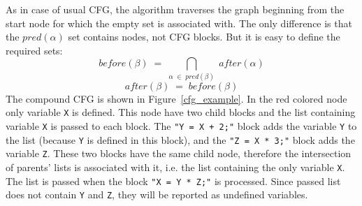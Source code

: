 \documentclass{sig-alternate-05-2015}
\begin{document}
As in case of usual CFG, the algorithm traverses the graph beginning from the start node for which the empty set is associated with. The only difference is that the $pred(\alpha)$ set contains nodes, not CFG blocks. But it is easy to define the required sets:
$$
before (\beta) \;=\; \bigcap_{\alpha \;\in\; pred(\beta)} \;after(\alpha)
$$
$$
after (\beta) \;=\; before (\beta)
$$
The compound CFG is shown in Figure~\ref{cfg_example}. In the red colored node only variable \verb|X| is defined. This node have two child blocks and the list containing variable \verb|X| is passed to each block. The \verb|"Y = X + 2;"| block adds the variable \verb|Y| to the list (because \verb|Y| is defined in this block), and the \verb|"Z = X * 3;"| block adds the variable \verb|Z|. These two blocks have the same child node, therefore the intersection of parents' lists is associated with it, i.e. the list containing the only variable \verb|X|. The list is passed when the block \verb|"X = Y * Z;"| is processed. Since passed list does not contain \verb|Y| and \verb|Z|, they will be reported as undefined variables.
\end{document}
